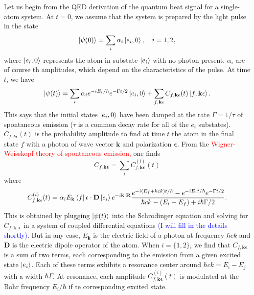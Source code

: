 \documentclass[11pt]{article}
\newcommand{\al}{\alpha}
\newcommand{\f}[2]{\frac{#1}{#2}}
\begin{document}
Let us begin from the QED derivation of the quantum beat signal for a single-atom system. At $t=0$, we assume that the system is prepared by the light pulse in the state
\begin{equation*}
\ket{\psi(0)} = \sum_i \al_i \ket{e_i,0}, \quad i = 1,2,
\end{equation*}
where $\ket{e_i,0}$ represents the atom in substate $\ket{e_i}$ with no photon present. $\al_i$ are of course th amplitudes, which depend on the characteristics of the pulse. At time $t$, we have
\begin{equation*}
\ket{\psi(t)} = \sum_i \al_i e^{-i E_t/\hbar} e^{-\Gamma t/2} \ket{e_i,0} + \sum_{f,\mathbf{k\epsilon}} C_{f,\mathbf{k\epsilon}}(t)\ket{f,\mathbf{k\epsilon}}.
\end{equation*}
This says that the initial states $\ket{e_i,0}$ have been damped at the rate $\Gamma = 1/\tau$ of spontaneous emission ($\tau$ is a common decay rate for all of the $e_i$ substates). $C_{f,k\epsilon}(t)$ is the probability amplitude to find at time $t$ the atom in the final state $f$ with a photon of wave vector $\mathbf{k}$ and polarization $\mathbf{\epsilon}$.  From the \textcolor{red}{Wigner-Weisskopf theory of spontaneous emission,} one finds
\begin{equation*}
C_{f,\mathbf{k\epsilon}} = \sum_i C_{f,\mathbf{k\epsilon}}^{(i)} (t)
\end{equation*}
where
\begin{equation}\label{eq:WignerWeisskopf}
C_{f,\mathbf{k\epsilon}}^{(i)} (t) = \al_i E_\mathbf{k} \bra{f} \mathbf{\epsilon}\cdot \mathbf{D} \ket{e_i} e^{-i\mathbf{k}\cdot \mathbf{R}} \f{e^{-i(E_f + \hbar c k)t/\hbar}  -e^{-iE_i t/\hbar}e^{-\Gamma t / 2}  }{\hbar c k - (E_i - E_f) + i\hbar \Gamma/2}.
\end{equation}
This is obtained by plugging $\ket{\psi(t)}$ into the Schr\"{o}dinger equation and solving for $C_{f,\mathbf{k,\epsilon}}$ in a system of coupled differential equations \textcolor{blue}{(I will fill in the details shortly)}. But in any case, $E_\mathbf{k}$ is the electric field of a photon at frequency $\hbar c k$ and $\mathbf{D}$ is the electric dipole operator of the atom. When $i = \{1,2\}$, we find that $C_{f, \mathbf{k\epsilon}}$ is a sum of two terms, each corresponding to the emission from a given excited state $\ket{e_i}$. Each of these terms exhibits a resonance center around $\hbar c k = E_i - E_j$ with a width $\hbar \Gamma$. At resonance, each amplitude $C_{f,\mathbf{k\epsilon}}^{(i)} (t)$ is modulated at the Bohr frequency $E_i/\hbar$ if te corresponding excited state. 
\end{document}
